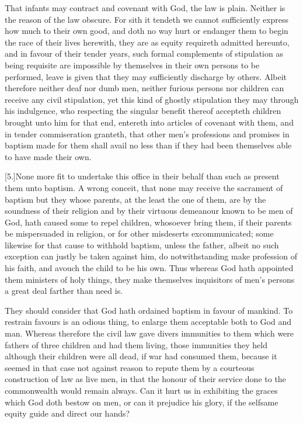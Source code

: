 That infants may contract and covenant with God, the law is plain.
 Neither is the reason of the law obscure. For sith it tendeth we cannot sufficiently express how much to their own good, and doth no way hurt or endanger them to begin the race of their lives herewith, they are as equity requireth admitted hereunto, and in favour of their tender years, such formal complements of stipulation as being requisite are impossible by themselves in their own persons to be performed, leave is given that they may sufficiently discharge by others. Albeit therefore neither deaf nor dumb men, neither furious persons nor children can receive any civil stipulation, yet this kind of ghostly stipulation they may through his indulgence, who respecting the singular benefit thereof accepteth children brought unto him for that end, entereth into articles of covenant with them, and in tender commiseration granteth, that other men’s professions and promises in baptism made for them shall avail no less than if they had been themselves able to have made their own.

[5.]None more fit to undertake this office in their behalf than such as present them unto baptism. A wrong conceit, that none may receive the sacrament of baptism but they whose parents, at the least the one of them, are by the soundness of their religion and by their virtuous demeanour known to be men of God, hath caused some to repel children, whosoever bring them, if their parents be mispersuaded in religion, or for other misdeserts excommunicated; some likewise for that cause to withhold baptism, unless the father, albeit no such exception can justly be taken against him, do notwithstanding make profession of his faith, and avouch the child to be his own. Thus whereas God hath appointed  them ministers of holy things, they make themselves inquisitors of men’s persons a great deal farther than need is.

They should consider that God hath ordained baptism in favour of mankind. To restrain favours is an odious thing, to enlarge them acceptable both to God and man. Whereas therefore the civil law gave divers immunities to them which were fathers of three children and had them living, those immunities they held although their children were all dead, if war had consumed them, because it seemed in that case not against reason to repute them by a courteous construction of law as live men, in that the honour of their service done to the commonwealth would remain always. Can it hurt us in exhibiting the graces which God doth bestow on men, or can it prejudice his glory, if the selfsame equity guide and direct our hands?

